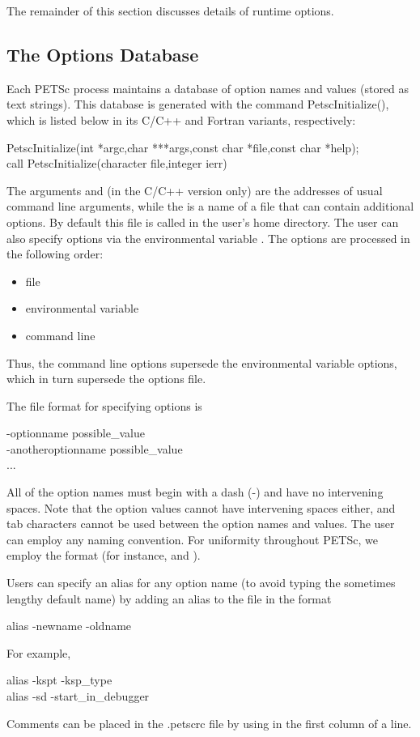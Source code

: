 {{The remainder of this section discusses details of runtime options.

\subsection{The Options Database}

Each PETSc process maintains a database of option names and values
(stored as text strings). This database is generated with the command
PetscInitialize(), which is listed below in its C/C++ and
Fortran variants, respectively:
\begin{tabbing}
  PetscInitialize(int *argc,char ***args,const char *file,const char *help);\\
   call PetscInitialize(character file,integer ierr)
\end{tabbing}
The arguments  and  (in the C/C++ version only) are
the addresses of usual command line arguments, while the  is a name of
a file that can contain additional options.
By default this file is called   in the
user's home directory.  The user can also specify options via the
environmental variable .  
The options are processed in the following order:
\begin{itemize}
\item file
\item environmental variable
\item command line
\end{itemize}
Thus, the command line options supersede the environmental variable
options, which in turn supersede the options file.

The file format for specifying options is
\begin{tabbing}
   -optionname possible\_value\\
   -anotheroptionname possible\_value\\
   ...
\end{tabbing}
All of the option names must begin with a dash (-) and have no intervening
spaces.  Note that the option values cannot
have intervening spaces either, and tab characters cannot be used
between the option names and values.
The user can employ any naming convention.  For uniformity throughout
PETSc, we employ the format  (for instance,
 and ).

Users can specify an alias for any option name (to avoid typing the
sometimes lengthy default name) by adding an alias to the
  file in the format
 
\begin{tabbing}
   alias -newname -oldname
\end{tabbing}
For example,
\begin{tabbing}
   alias -kspt -ksp\_type\\
   alias -sd -start\_in\_debugger
\end{tabbing}
Comments can be placed in the .petscrc file by using \trl{#} in the first column of a line.

}}
